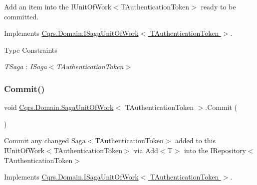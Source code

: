 Add an item into the I\+Unit\+Of\+Work$<$\+T\+Authentication\+Token$>$ ready to be committed. 



Implements \hyperlink{interfaceCqrs_1_1Domain_1_1ISagaUnitOfWork_a5e7c8e18a8d71fc915db48fac00e7da4_a5e7c8e18a8d71fc915db48fac00e7da4}{Cqrs.\+Domain.\+I\+Saga\+Unit\+Of\+Work$<$ T\+Authentication\+Token $>$}.

\begin{Desc}
\item[Type Constraints]\begin{description}
\item[{\em T\+Saga} : {\em I\+Saga$<$T\+Authentication\+Token$>$}]\end{description}
\end{Desc}
\mbox{\label{classCqrs_1_1Domain_1_1SagaUnitOfWork_aed2756dadfe0a0903a791944d02c4db8_aed2756dadfe0a0903a791944d02c4db8}} 
\subsubsection{\texorpdfstring{Commit()}{Commit()}}
{\footnotesize\ttfamily void \hyperlink{classCqrs_1_1Domain_1_1SagaUnitOfWork}{Cqrs.\+Domain.\+Saga\+Unit\+Of\+Work}$<$ T\+Authentication\+Token $>$.Commit (\begin{DoxyParamCaption}{ }\end{DoxyParamCaption})}



Commit any changed Saga$<$\+T\+Authentication\+Token$>$ added to this I\+Unit\+Of\+Work$<$\+T\+Authentication\+Token$>$ via Add$<$\+T$>$ into the I\+Repository$<$\+T\+Authentication\+Token$>$ 



Implements \hyperlink{interfaceCqrs_1_1Domain_1_1ISagaUnitOfWork_aaa8a63b5304c837deec8a0103eb702f7_aaa8a63b5304c837deec8a0103eb702f7}{Cqrs.\+Domain.\+I\+Saga\+Unit\+Of\+Work$<$ T\+Authentication\+Token $>$}.

\mbox{\label{classCqrs_1_1Domain_1_1SagaUnitOfWork_acebe159e3b27e36a91909e97cf37d28d_acebe159e3b27e36a91909e97cf37d28d}} 
